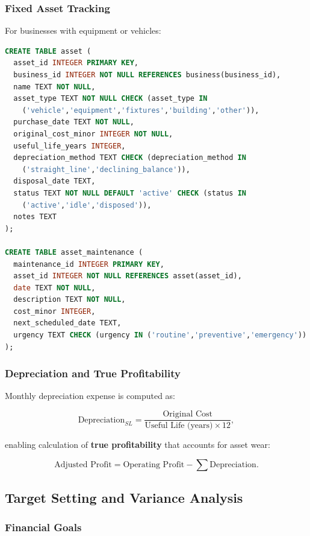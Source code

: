 \documentclass[10pt,a4paper]{article}
\begin{document}
\subsubsection{Fixed Asset Tracking}

For businesses with equipment or vehicles:

\begin{lstlisting}[language=SQL,caption={Asset and maintenance tracking}]
CREATE TABLE asset (
  asset_id INTEGER PRIMARY KEY,
  business_id INTEGER NOT NULL REFERENCES business(business_id),
  name TEXT NOT NULL,
  asset_type TEXT NOT NULL CHECK (asset_type IN 
    ('vehicle','equipment','fixtures','building','other')),
  purchase_date TEXT NOT NULL,
  original_cost_minor INTEGER NOT NULL,
  useful_life_years INTEGER,
  depreciation_method TEXT CHECK (depreciation_method IN 
    ('straight_line','declining_balance')),
  disposal_date TEXT,
  status TEXT NOT NULL DEFAULT 'active' CHECK (status IN 
    ('active','idle','disposed')),
  notes TEXT
);

CREATE TABLE asset_maintenance (
  maintenance_id INTEGER PRIMARY KEY,
  asset_id INTEGER NOT NULL REFERENCES asset(asset_id),
  date TEXT NOT NULL,
  description TEXT NOT NULL,
  cost_minor INTEGER,
  next_scheduled_date TEXT,
  urgency TEXT CHECK (urgency IN ('routine','preventive','emergency'))
);
\end{lstlisting}

\subsubsection{Depreciation and True Profitability}

Monthly depreciation expense is computed as:

\[
\text{Depreciation}_{SL} = \frac{\text{Original Cost}}{\text{Useful Life (years)} \times 12},
\]

enabling calculation of \textbf{true profitability} that accounts for asset wear:

\[
\text{Adjusted Profit} = \text{Operating Profit} - \sum \text{Depreciation}.
\]

\subsection{Target Setting and Variance Analysis}

\subsubsection{Financial Goals}
\end{document}
